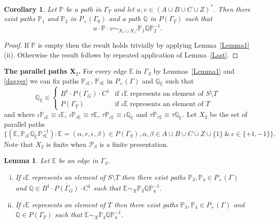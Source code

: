 \documentclass[11pt]{amsart}
\newtheorem{cor}{Corollary}
\newtheorem{lem}{Lemma}
\theoremstyle{plain}
\begin{document}
\begin{cor}\label{LastCorol}
Let ${\mathbb{P}}$ be a path in $\Gamma_T$ and let $u,v \in (A \cup B \cup C \cup Z)^*$. Then there exist paths ${\mathbb{P}}_1$ and ${\mathbb{P}}_2$ in $P_+(\Gamma_0)$ and a path ${\mathbb{Q}}$ in $P(\Gamma_T)$ such that 
\[
u \cdot {\mathbb{P}} \cdot v \sim_{X_1 \cup X_1'} {\mathbb{P}}_1 {\mathbb{Q}} {\mathbb{P}}_2^{-1}.
\]
\end{cor} 
\begin{proof}
If ${\mathbb{P}}$ is empty then the result holds trivially by applying Lemma~\ref{Lemma1}(ii). Otherwise the result follows by repeated application of Lemma~\ref{Last}. 
\end{proof}

\noindent \textbf{The parallel paths $\mathbf X_2$.} For every edge ${\mathbb{E}}$ in $\Gamma_S$ by Lemmas~\ref{Lemma1} and \ref{dagger} we can fix paths ${\mathbb{P}}_{\iota {\mathbb{E}}}$, ${\mathbb{P}}_{\tau {\mathbb{E}}}$ in $P_+(\Gamma)$ and ${\mathbb{Q}}_{\mathbb{E}}$ such that 
\[
{\mathbb{Q}}_{\mathbb{E}} \in
\begin{cases}
\overline{B^1 \cdot P(\Gamma_G) \cdot C^1} & \mbox{if $\iota {\mathbb{E}}$ represents an element of $S \setminus T$} \\
P(\Gamma_T) & \mbox{if $\iota {\mathbb{E}}$ represents an element of $T$}
\end{cases}
\]
and where $\iota {\mathbb{P}}_{\iota {\mathbb{E}}} \equiv \iota {\mathbb{E}}$, $\iota {\mathbb{P}}_{\tau {\mathbb{E}}} \equiv \tau {\mathbb{E}}$, $\tau {\mathbb{P}}_{\iota {\mathbb{E}}} \equiv \iota {\mathbb{Q}}_{\mathbb{E}}$ and $\tau {\mathbb{P}}_{\tau {\mathbb{E}}} \equiv \tau {\mathbb{Q}}_{\mathbb{E}}$. Let $X_2$ be the set of parallel paths 
\[
\{ ({\mathbb{E}}, {\mathbb{P}}_{\iota {\mathbb{E}}} {\mathbb{Q}}_{\mathbb{E}} {\mathbb{P}}_{\tau {\mathbb{E}}}^{-1}):
{\mathbb{E}} = (\alpha, r, \epsilon, \beta) \in P(\Gamma_S), \alpha, \beta \in A \cup B \cup C \cup Z \cup \{ 1 \} \ \& \ \epsilon \in \{ +1, -1 \} \}.
\]
Note that $X_2$ is finite when $\mathcal{P}_S$ is a finite presentation. 
\begin{lem}\label{Lemma3}
Let ${\mathbb{E}}$ be an edge in $\Gamma_S$.
\begin{enumerate}[(i)]
\item If $\iota {\mathbb{E}}$ represents an element of $S \setminus T$ then there exist paths ${\mathbb{P}}_3, {\mathbb{P}}_4 \in P_+(\Gamma)$ and ${\mathbb{Q}} \in \overline{B^1 \cdot P(\Gamma_G) \cdot C^1}$ such that
$
{\mathbb{E}} \sim_{X} {\mathbb{P}}_3 {\mathbb{Q}} {\mathbb{P}}_4^{-1}.
$
\item If $\iota {\mathbb{E}}$ represents an element of $T$ then there exist paths ${\mathbb{P}}_3, {\mathbb{P}}_4 \in P_+(\Gamma)$ and ${\mathbb{Q}} \in P(\Gamma_T)$ such that
$
{\mathbb{E}} \sim_{X} {\mathbb{P}}_3 {\mathbb{Q}} {\mathbb{P}}_4^{-1}.
$
\end{enumerate}
\end{lem}
\end{document}
